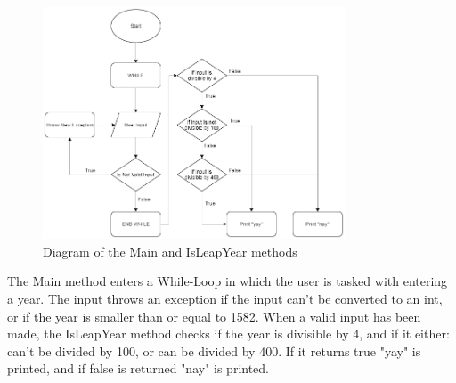 \documentclass[12pt]{article}
\begin{document}
\maketitle
\begin{figure}[h]
    \centering
    \includegraphics[width=0.8\textwidth]{images/Assignment_0_diagram.png}
    \caption{Diagram of the Main and IsLeapYear methods}
\end{figure}
The Main method enters a While-Loop in which the user is tasked with entering a year. The input throws an exception if the input can't be converted to an int, or if the year is smaller than or equal to 1582. When a valid input has been made, the IsLeapYear method checks if the year is divisible by 4, and if it either: can't be divided by 100, or can be divided by 400. If it returns true "yay" is printed, and if false is returned "nay" is printed.
\end{document}
